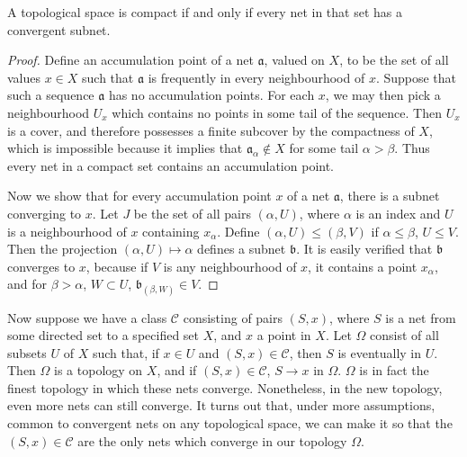 \begin{theorem}
    A topological space is compact if and only if every net in that set has a convergent subnet.
\end{theorem}
\begin{proof}
    Define an accumulation point of a net $\mathfrak{a}$, valued on $X$, to be the set of all values $x \in X$ such that $\mathfrak{a}$ is frequently in every neighbourhood of $x$. Suppose that such a sequence $\mathfrak{a}$ has no accumulation points. For each $x$, we may then pick a neighbourhood $U_x$ which contains no points in some tail of the sequence. Then $U_x$ is a cover, and therefore possesses a finite subcover by the compactness of $X$, which is impossible because it implies that $\mathfrak{a}_\alpha \not \in X$ for some tail $\alpha > \beta$. Thus every net in a compact set contains an accumulation point.

    Now we show that for every accumulation point $x$ of a net $\mathfrak{a}$, there is a subnet converging to $x$. Let $J$ be the set of all pairs $(\alpha, U)$, where $\alpha$ is an index and $U$ is a neighbourhood of $x$ containing $x_\alpha$. Define $(\alpha, U) \leq (\beta, V)$ if $\alpha \leq \beta$, $U \leq V$. Then the projection $(\alpha, U) \mapsto \alpha$ defines a subnet $\mathfrak{b}$. It is easily verified that $\mathfrak{b}$ converges to $x$, because if $V$ is any neighbourhood of $x$, it contains a point $x_\alpha$, and for $\beta > \alpha$, $W \subset U$, $\mathfrak{b}_{(\beta, W)} \in V$.
\end{proof}

Now suppose we have a class $\mathcal{C}$ consisting of pairs $(S,x)$, where $S$ is a net from some directed set to a specified set $X$, and $x$ a point in $X$. Let $\Omega$ consist of all subsets $U$ of $X$ such that, if $x \in U$ and $(S,x) \in \mathcal{C}$, then $S$ is eventually in $U$. Then $\Omega$ is a topology on $X$, and if $(S,x) \in \mathcal{C}$, $S \to x$ in $\Omega$. $\Omega$ is in fact the finest topology in which these nets converge. Nonetheless, in the new topology, even more nets can still converge. It turns out that, under more assumptions, common to convergent nets on any topological space, we can make it so that the $(S,x) \in \mathcal{C}$ are the only nets which converge in our topology $\Omega$.

